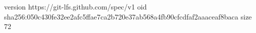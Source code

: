 version https://git-lfs.github.com/spec/v1
oid sha256:050c430fe32ee2afc5ffae7ca2b720e37ab568a4fb90cfcdfaf2aaaceaf8baca
size 72
